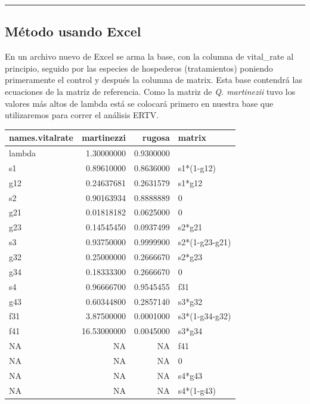 \documentclass[
  12pt,
  letterpaper,
]{book}
\begin{document}
\begin{center}\rule{0.5\linewidth}{0.5pt}\end{center}

\subsection{Método usando Excel}\label{muxe9todo-usando-excel}

En un archivo nuevo de Excel se arma la base, con la columna de
vital\_rate al principio, seguido por las especies de hospederos
(tratamientos) poniendo primeramente el control y después la columna de
matrix. Esta base contendrá las ecuaciones de la matriz de referencia.
Como la matriz de \emph{Q. martinezii} tuvo los valores más altos de
lambda está se colocará primero en nuestra base que utilizaremos para
correr el análisis ERTV.

\begin{table}
\fontsize{12.0pt}{14.0pt}\selectfont
\begin{tabular*}{\linewidth}{@{\extracolsep{\fill}}lrrl}
\toprule
names.vitalrate & martinezzi & rugosa & matrix \\ 
\midrule\addlinespace[2.5pt]
lambda & 1.30000000 & 0.9300000 &  \\ 
s1 & 0.89610000 & 0.8636000 & s1*(1-g12) \\ 
g12 & 0.24637681 & 0.2631579 & s1*g12 \\ 
s2 & 0.90163934 & 0.8888889 & 0 \\ 
g21 & 0.01818182 & 0.0625000 & 0 \\ 
g23 & 0.14545450 & 0.0937499 & s2*g21 \\ 
s3 & 0.93750000 & 0.9999900 & s2*(1-g23-g21) \\ 
g32 & 0.25000000 & 0.2666670 & s2*g23 \\ 
g34 & 0.18333300 & 0.2666670 & 0 \\ 
s4 & 0.96666700 & 0.9545455 & f31 \\ 
g43 & 0.60344800 & 0.2857140 & s3*g32 \\ 
f31 & 3.87500000 & 0.0001000 & s3*(1-g34-g32) \\ 
f41 & 16.53000000 & 0.0045000 & s3*g34 \\ 
NA & NA & NA & f41 \\ 
NA & NA & NA & 0 \\ 
NA & NA & NA & s4*g43 \\ 
NA & NA & NA & s4*(1-g43) \\ 
\bottomrule
\end{tabular*}
\end{table}
\end{document}
